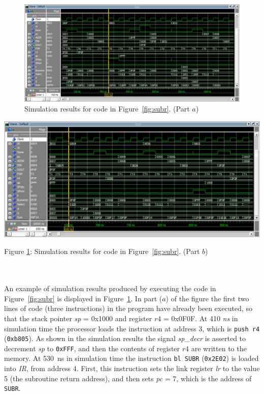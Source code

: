 \documentclass[epsfig,10pt,fullpage]{article} \addtolength{\textwidth}{1.5in}
\begin{document}
\begin{enumerate}
\begin{minipage}[H]{15.5 cm}
\begin{figure}[H]
    \begin{center}
        \includegraphics[width = .9\textwidth]{figures/push_bl.png}
    \end{center}
    \begin{center}
        \caption{Simulation results for code in Figure~\ref{fig:subr}. (Part $a$)}
        \label{fig:subr1}
    \end{center}
\end{figure}

\begin{center}
        \includegraphics[width = .9\textwidth]{figures/bl_pop.png}
\end{center}

\begin{center}
Figure \ref{fig:subr1}: Simulation results for code in Figure~\ref{fig:subr}. (Part $b$)
\end{center}
\end{minipage}

~\\
~\\
An example of simulation results produced by executing the code in Figure~\ref{fig:subr} is
displayed in Figure~\ref{fig:subr1}. In part ($a$) of the figure 
the first two lines of code (three instructions) in the program have already been executed,
so that the stack pointer {\it sp} = 0x1000 and 
register $r4$ = 0x0F0F. At 410 {\it ns} in simulation time the processor loads the
instruction at address 3, which is \texttt{push~r4} (\texttt{0xb805}). 
As shown in the simulation results
the signal {\it sp\_decr} is asserted to decrement {\it sp} to \texttt{0xFFF}, and then
the contents of register $r4$ are written to the memory. At 530~ns in simulation time
the instruction \texttt{bl~SUBR} (\texttt{0x2E02}) is loaded into {\it IR}, from address 4. 
First, this instruction sets the link register {\it lr} to the value 5 (the subroutine return 
address), and then sets {\it pc} = 7, which is the address of \texttt{SUBR}. 


\end{enumerate}
\end{document}
